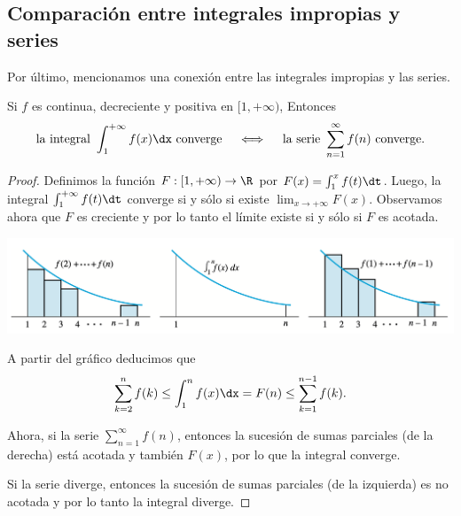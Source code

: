 \subsection{Comparación entre integrales impropias y series}

Por último, mencionamos una conexión entre las integrales impropias y las series.

\begin{theorem}
  Si $f$ es continua, decreciente y positiva en $[1,+\infty)$, Entonces
  \[
  \text{la integral }\int_1^{+\infty} f(x)\dx
  \text{ converge}
  \quad\iff\quad
  \text{la serie }\sum_{n=1}^\infty f(n)
  \text{ converge}.
  \]
\end{theorem}

\begin{proof}
  Definimos la función $F:[1,+\infty)\to \R$ por $F(x) = \int_1^x f(t)\dt$.
  Luego, la integral $\int_1^{+\infty} f(t)\dt$ converge si y sólo si existe $\lim_{x\to+\infty}F(x)$.
  Observamos ahora que $F$ es creciente y por lo tanto el límite existe si y sólo si $F$ es acotada.

  \begin{center}
    \includegraphics[width=.8\textwidth]{pics/comparacion-serie-integral.png}
  \end{center}

  A partir del gráfico deducimos que
  \begin{equation}\label{eq:comparacion-serie-integral}
    \sum_{k=2}^n f(k) \le \int_1^n f(x)\dx = F(n) \le \sum_{k=1}^{n-1} f(k).
  \end{equation}

  Ahora, si la serie $\sum_{n=1}^\infty f(n)$, entonces la sucesión de sumas parciales (de la derecha) está acotada y también $F(x)$, por lo que la integral converge.

  Si la serie diverge, entonces la sucesión de sumas parciales (de la izquierda) es no acotada y por lo tanto la integral diverge.
\end{proof}

